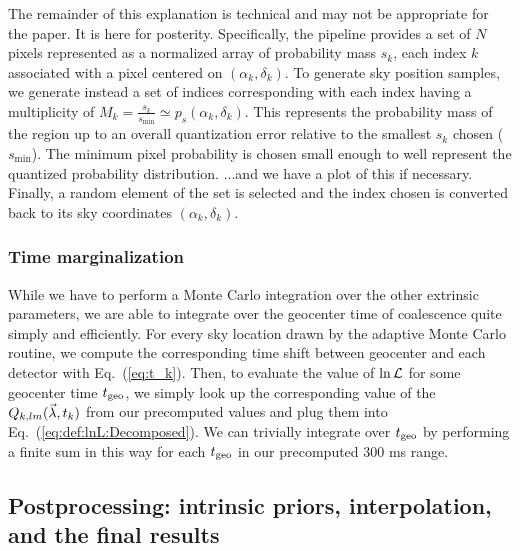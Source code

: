 {\color{blue} The remainder of this explanation is technical and may not be appropriate for the paper. It is here for posterity.} Specifically, the \BS{} pipeline provides a set of $N$ pixels represented as a normalized array of probability mass $s_k$, each index $k$ associated with a pixel centered on $(\alpha_k,\delta_k)$.
%
To generate sky position samples, we generate instead a set of indices corresponding with each index having a multiplicity of $M_k=\frac{s_k}{s_{\text{min}}}\simeq p_s(\alpha_k, \delta_k)$. This represents the probability mass of the region up to an overall quantization error relative to the smallest $s_k$ chosen ($s_{\text{min}}$). The minimum pixel probability is chosen small enough to well represent the quantized probability distribution. {\color{blue} ...and we have a plot of this if necessary}. Finally, a random element of the set is selected and the index chosen is converted back to its sky coordinates $(\alpha_k,\delta_k)$. 


\subsubsection{Time marginalization}
\label{sec:time_marg}

While we have to perform a Monte Carlo integration over the other extrinsic parameters, we are able to
integrate over the geocenter time of coalescence quite simply and efficiently.
For every sky location drawn by the adaptive Monte Carlo routine, we compute the
corresponding time shift between geocenter and each detector with Eq.~(\ref{eq:t_k}).
Then, to evaluate the value of $\ln {\cal L}$ for some geocenter time $t_{\rm geo}$,
we simply look up the corresponding value of the $Q_{k,lm}(\vec{\lambda},t_k)$ from our precomputed values and plug them
into Eq.~(\ref{eq:def:lnL:Decomposed}).
We can trivially integrate over $t_{\rm geo}$ by performing a finite sum in this way 
for each $t_{\rm geo}$ in our precomputed $300$ ms range.





\subsection{Postprocessing: intrinsic priors, interpolation, and the final results}

